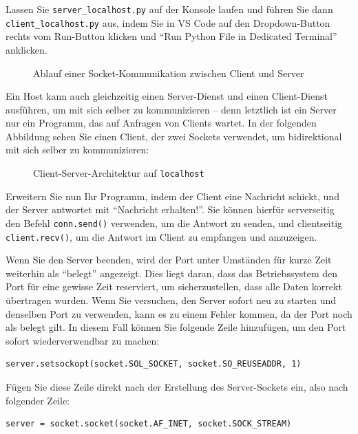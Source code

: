 \begin{myexercise}
    Lassen Sie \texttt{server\_localhost.py} auf der Konsole laufen und führen Sie dann \texttt{client\_\allowbreak localhost.py} aus, indem Sie in VS Code auf den Dropdown-Button rechts vom Run-Button klicken und \enquote{Run Python File in Dedicated Terminal} anklicken.
    \begin{figure}[H]
        \centering
        \resizebox{\linewidth}{!}{}
        \caption{Ablauf einer Socket-Kommunikation zwischen Client und Server}
    \end{figure}
    Ein Host kann auch gleichzeitig einen Server-Dienst und einen Client-Dienst ausführen, um mit sich selber zu kommunizieren -- denn letztlich ist ein Server nur ein Programm, das auf Anfragen von Clients wartet. In der folgenden Abbildung sehen Sie einen Client, der zwei Sockets verwendet, um bidirektional mit sich selber zu kommunizieren:
    \begin{figure}[H]
        \centering
        
        \caption{Client-Server-Architektur auf \texttt{localhost}}
    \end{figure}
\end{myexercise}

\begin{myexercise}
    Erweitern Sie nun Ihr Programm, indem der Client eine Nachricht schickt, und der Server antwortet mit \enquote{Nachricht erhalten!}. Sie können hierfür serverseitig den Befehl \lstinline|conn.send()| verwenden, um die Antwort zu senden, und clientseitig \lstinline|client.recv()|, um die Antwort im Client zu empfangen und anzuzeigen.
\end{myexercise}

\begin{myattention}
    Wenn Sie den Server beenden, wird der Port unter Umständen für kurze Zeit weiterhin als \enquote{belegt} angezeigt. Dies liegt daran, dass das Betriebssystem den Port für eine gewisse Zeit reserviert, um sicherzustellen, dass alle Daten korrekt übertragen wurden. Wenn Sie versuchen, den Server sofort neu zu starten und denselben Port zu verwenden, kann es zu einem Fehler kommen, da der Port noch als belegt gilt. In diesem Fall können Sie folgende Zeile hinzufügen, um den Port sofort wiederverwendbar zu machen:
    \begin{lstlisting}
server.setsockopt(socket.SOL_SOCKET, socket.SO_REUSEADDR, 1)
    \end{lstlisting}
    Fügen Sie diese Zeile direkt nach der Erstellung des Server-Sockets ein, also nach folgender Zeile:
    \begin{lstlisting}
server = socket.socket(socket.AF_INET, socket.SOCK_STREAM)
    \end{lstlisting}
\end{myattention}

